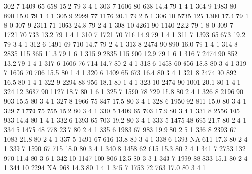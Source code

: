 \documentclass{article}
\begin{document}
\begin{Schunk}
\begin{Soutput}
302       7  1409  65  658 15.2  79      3       4        1
303       7  1606  80  638 14.4  79      1       4        1
304       9  1983  80  890 15.0  79      1       4        1
305       9  2999  77 1176 20.1  79      2       5        1
306      10  5735 125 1300 17.4  79      1       8        0
307       9  2311  71 1063 24.8  79      2       4        1
308      10  4261  90 1140 22.2  79      1       8        0
309       7  1721  70  733 13.2  79      1       4        1
310       7  1721  70  716 14.9  79      1       4        1
311       7  1393  65  673 19.2  79      3       4        1
312       6  1491  69  710 14.7  79      2       4        1
313       8  2474  90  890 16.0  79      1       4        1
314       8  2835 115  865 11.3  79      1       6        1
315       9  2835 115  900 12.9  79      1       6        1
316       7  2474  90  852 13.2  79      1       4        1
317       6  1606  76  714 14.7  80      2       4        1
318       6  1458  60  656 18.8  80      3       4        1
319       7  1606  70  706 15.5  80      1       4        1
320       6  1409  65  673 16.4  80      3       4        1
321       8  2474  90  892 16.5  80      1       4        1
322       9  2294  88  956 18.1  80      1       4        1
323      10  2474  90 1001 20.1  80      1       4        1
324      12  3687  90 1127 18.7  80      1       6        1
325       7  1590  78  729 15.8  80      2       4        1
326       8  2196  90  903 15.5  80      3       4        1
327       8  1966  75  847 17.5  80      3       4        1
328       6  1950  92  811 15.0  80      3       4        1
329       7  1770  75  755 15.2  80      3       4        1
330       5  1409  65  703 17.9  80      3       4        1
331       8  2556 105  933 14.4  80      1       4        1
332       6  1393  65  703 19.2  80      3       4        1
333       5  1475  48  695 21.7  80      2       4        1
334       5  1475  48  778 23.7  80      2       4        1
335       6  1983  67  983 19.9  80      2       5        1
336       8  2393  67 1083 21.8  80      2       4        1
337       5  1491  67  616 13.8  80      3       4        1
338       6  1393  NA  611 17.3  80      2       4        1
339       7  1590  67  715 18.0  80      3       4        1
340       8  1458  62  615 15.3  80      2       4        1
341       7  2753 132  970 11.4  80      3       6        1
342      10  1147 100  806 12.5  80      3       3        1
343       7  1999  88  833 15.1  80      2       4        1
344      10  2294  NA  968 14.3  80      1       4        1
345       7  1753  72  763 17.0  80      3       4        1

\end{Soutput}
\end{Schunk}
\end{document}

